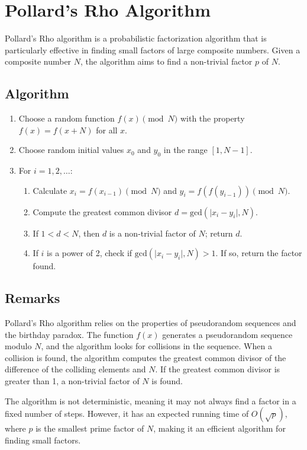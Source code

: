 \documentclass[12pt,openany]{book}
\theoremstyle{definition}
\begin{document}
	\section*{Pollard's Rho Algorithm}
	
	Pollard's Rho algorithm is a probabilistic factorization algorithm that is particularly effective in finding small factors of large composite numbers. Given a composite number $N$, the algorithm aims to find a non-trivial factor $p$ of $N$.
	
	\subsection*{Algorithm}
	
	\begin{enumerate}
		\item Choose a random function $f(x) \pmod{N}$ with the property $f(x) = f(x + N)$ for all $x$.
		\item Choose random initial values $x_0$ and $y_0$ in the range $[1, N-1]$.
		\item For $i = 1, 2, \ldots$:
		\begin{enumerate}
			\item Calculate $x_i = f(x_{i-1}) \pmod{N}$ and $y_i = f(f(y_{i-1})) \pmod{N}$.
			\item Compute the greatest common divisor $d = \text{gcd}(\lvert x_i - y_i \rvert, N)$.
			\item If $1 < d < N$, then $d$ is a non-trivial factor of $N$; return $d$.
			\item If $i$ is a power of 2, check if $\text{gcd}(\lvert x_i - y_i \rvert, N) > 1$. If so, return the factor found.
		\end{enumerate}
	\end{enumerate}
	
	\subsection*{Remarks}
	
	Pollard's Rho algorithm relies on the properties of pseudorandom sequences and the birthday paradox. The function $f(x)$ generates a pseudorandom sequence modulo $N$, and the algorithm looks for collisions in the sequence. When a collision is found, the algorithm computes the greatest common divisor of the difference of the colliding elements and $N$. If the greatest common divisor is greater than 1, a non-trivial factor of $N$ is found.
	
	The algorithm is not deterministic, meaning it may not always find a factor in a fixed number of steps. However, it has an expected running time of $O(\sqrt{p})$, where $p$ is the smallest prime factor of $N$, making it an efficient algorithm for finding small factors.
	

\end{document}
